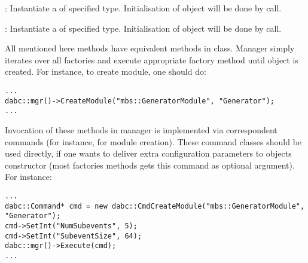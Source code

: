 \item [\func{CreateDataInput()}] : 
   Instantiate a  of specified type.
   Initialisation of object will be done by  call.

\item [\func{CreateDataOutput()}] : 
   Instantiate a  of specified type.
   Initialisation of object will be done by  call.
	
\edes      

All mentioned here methods have equivalent methods in  class.
Manager simply iterates over all factories and execute appropriate factory method
until object is created. For instance, to create module, one should do:

\begin{small}
\begin{verbatim}
...
dabc::mgr()->CreateModule("mbs::GeneratorModule", "Generator");
...
\end{verbatim}     
\end{small}

Invocation of these methods in manager is implemented via correspondent commands
(for instance,  for module creation). 
These command classes should be used directly, if one wants to deliver extra 
configuration parameters to objects constructor (most factories methods gets
this command as optional argument). For instance:

\begin{small}
\begin{verbatim}
...
dabc::Command* cmd = new dabc::CmdCreateModule("mbs::GeneratorModule", "Generator");
cmd->SetInt("NumSubevents", 5);
cmd->SetInt("SubeventSize", 64);
dabc::mgr()->Execute(cmd);
...
\end{verbatim}     
\end{small}



